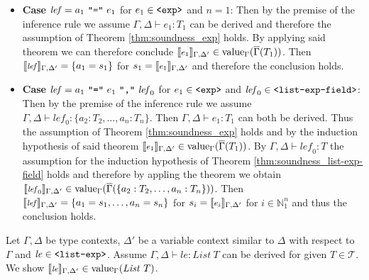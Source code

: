 \documentclass[]{scrbook}
\newcommand{\mf}[1]{\text{\texttt{#1}}}
\newcommand{\semantic}[1]{\llbracket \text{\footnotesize\texttt{#1}} \rrbracket}
\theoremstyle{definition}
\theoremstyle{definition}
\theoremstyle{definition}
\theoremstyle{remark}
\begin{document}
\begin{itemize}
\item\textbf{Case} $\mathit{lef}=a_1 \ \mf{"="} \ e_1$ for $e_1\in\mf{<exp>}$ and $n = 1$: Then by the premise of the inference rule we assume $\Gamma,\Delta\vdash e_1:T_1$ can be derived and therefore the assumption of Theorem \ref{thm:soundness_exp} holds. By applying said theorem we can therefore conclude \(\semantic{$e_1$}_{\Gamma,\Delta'}\in\text{value}_\Gamma(\overline{\Gamma}(T_1))\). Then \(\semantic{$\mathit{lef}$}_{\Gamma,\Delta'} = \{a_1 = s_1\}\) for $s_1=\semantic{$e_1$}_{\Gamma,\Delta'}$ and therefore the conclusion holds.
\item\textbf{Case} $\mathit{lef}=a_1 \ \mf{"="} \ e_1 \ \mf{","} \ \mathit{lef}_0$ for $e_1\in\mf{<exp>}$ and $\mathit{lef}_0\in\mf{<list-exp-field>}$: Then by the premise of the inference rule we assume $\Gamma,\Delta\vdash \mathit{lef}_0:\{a_2:T_2,\dots,a_n:T_n\}$. Then $\Gamma,\Delta\vdash e_1: T_1$ can both be derived. Thus the assumption of Theorem \ref{thm:soundness_exp} holds and by the induction hypothesis of said theorem \(\semantic{$e_1$}_{\Gamma,\Delta'}\in\text{value}_\Gamma(\overline{\Gamma}(T_1))\). By $\Gamma,\Delta\vdash \mathit{lef}_0:T$ the assumption for the induction hypothesis of Theorem \ref{thm:soundness_list-exp-field} holds and therefore by appling the theorem we obtain \(\semantic{$\mathit{lef}_0$}_{\Gamma,\Delta'}\in\text{value}_\Gamma(\overline{\Gamma}(\{a_2:T_2,\dots,a_n:T_n\}))\). Then \(\semantic{$\mathit{lef}$}_{\Gamma,\Delta'}=\{a_1=s_1,\dots,a_n=s_n\}\) for $s_i=\semantic{$e_i$}_{\Gamma,\Delta'}$ for $i\in\mathbb{N}_1^n$ and thus the conclusion holds.
\end{itemize}

Let \(\Gamma,\Delta\) be type contexts, \(\Delta'\) be a variable
context similar to \(\Delta\) with respect to \(\Gamma\) and
\(\mathit{le}\in\mf{<list-exp>}\). Assume
\(\Gamma,\Delta\vdash\mathit{le}:\mathit{List} \ T\) can be derived for
given \(T\in\mathcal{T}\). We show
\(\semantic{$\mathit{le}$}_{\Gamma,\Delta'}\in\text{value}_\Gamma(\mathit{List} \ T)\).
\end{document}
